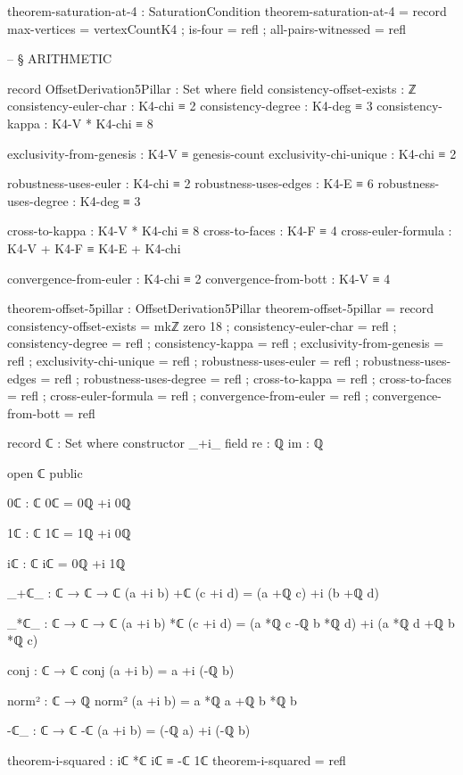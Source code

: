 \documentclass[11pt,a4paper]{book}
\begin{document}
\begin{code}
theorem-saturation-at-4 : SaturationCondition
theorem-saturation-at-4 = record
  { max-vertices = vertexCountK4
  ; is-four = refl
  ; all-pairs-witnessed = refl
  }


-- § ARITHMETIC

record OffsetDerivation5Pillar : Set where
  field
    consistency-offset-exists : ℤ
    consistency-euler-char : K4-chi ≡ 2
    consistency-degree : K4-deg ≡ 3
    consistency-kappa : K4-V * K4-chi ≡ 8
    
    exclusivity-from-genesis : K4-V ≡ genesis-count
    exclusivity-chi-unique : K4-chi ≡ 2
    
    robustness-uses-euler : K4-chi ≡ 2
    robustness-uses-edges : K4-E ≡ 6
    robustness-uses-degree : K4-deg ≡ 3
    
    cross-to-kappa : K4-V * K4-chi ≡ 8
    cross-to-faces : K4-F ≡ 4
    cross-euler-formula : K4-V + K4-F ≡ K4-E + K4-chi
    
    convergence-from-euler : K4-chi ≡ 2
    convergence-from-bott : K4-V ≡ 4

theorem-offset-5pillar : OffsetDerivation5Pillar
theorem-offset-5pillar = record
  { consistency-offset-exists = mkℤ zero 18
  ; consistency-euler-char = refl
  ; consistency-degree = refl
  ; consistency-kappa = refl
  ; exclusivity-from-genesis = refl
  ; exclusivity-chi-unique = refl
  ; robustness-uses-euler = refl
  ; robustness-uses-edges = refl
  ; robustness-uses-degree = refl
  ; cross-to-kappa = refl
  ; cross-to-faces = refl
  ; cross-euler-formula = refl
  ; convergence-from-euler = refl
  ; convergence-from-bott = refl
  }

record ℂ : Set where
  constructor _+i_
  field
    re : ℚ
    im : ℚ

open ℂ public

0ℂ : ℂ
0ℂ = 0ℚ +i 0ℚ

1ℂ : ℂ
1ℂ = 1ℚ +i 0ℚ

iℂ : ℂ
iℂ = 0ℚ +i 1ℚ

_+ℂ_ : ℂ → ℂ → ℂ
(a +i b) +ℂ (c +i d) = (a +ℚ c) +i (b +ℚ d)

_*ℂ_ : ℂ → ℂ → ℂ
(a +i b) *ℂ (c +i d) = (a *ℚ c -ℚ b *ℚ d) +i (a *ℚ d +ℚ b *ℚ c)

conj : ℂ → ℂ
conj (a +i b) = a +i (-ℚ b)

norm² : ℂ → ℚ
norm² (a +i b) = a *ℚ a +ℚ b *ℚ b

-ℂ_ : ℂ → ℂ
-ℂ (a +i b) = (-ℚ a) +i (-ℚ b)

theorem-i-squared : iℂ *ℂ iℂ ≡ -ℂ 1ℂ
theorem-i-squared = refl


\end{code}
\end{document}
